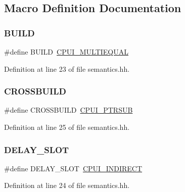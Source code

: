 \subsection{Macro Definition Documentation}
\mbox{\label{semantics_8hh_a03505fe2d99ef550d9e1d39f57048908}} 
\subsubsection{\texorpdfstring{BUILD}{BUILD}}
{\footnotesize\ttfamily \#define B\+U\+I\+LD~\mbox{\hyperlink{opcodes_8hh_abeb7dfb0e9e2b3114e240a405d046ea7a108d223da48e77fa181637fc3e75d9e8}{C\+P\+U\+I\+\_\+\+M\+U\+L\+T\+I\+E\+Q\+U\+AL}}}



Definition at line 23 of file semantics.\+hh.

\mbox{\label{semantics_8hh_a2b03cfa43a7f7132ca5adeb2ea9199ec}} 
\subsubsection{\texorpdfstring{CROSSBUILD}{CROSSBUILD}}
{\footnotesize\ttfamily \#define C\+R\+O\+S\+S\+B\+U\+I\+LD~\mbox{\hyperlink{opcodes_8hh_abeb7dfb0e9e2b3114e240a405d046ea7acd169003bfcb2e8dde0cb2dc1f534449}{C\+P\+U\+I\+\_\+\+P\+T\+R\+S\+UB}}}



Definition at line 25 of file semantics.\+hh.

\mbox{\label{semantics_8hh_abaef87dd5a374a8e2f3b01f0ae6ed3e4}} 
\subsubsection{\texorpdfstring{DELAY\_SLOT}{DELAY\_SLOT}}
{\footnotesize\ttfamily \#define D\+E\+L\+A\+Y\+\_\+\+S\+L\+OT~\mbox{\hyperlink{opcodes_8hh_abeb7dfb0e9e2b3114e240a405d046ea7aa89e33b07a26ca7d26b54315e45c8424}{C\+P\+U\+I\+\_\+\+I\+N\+D\+I\+R\+E\+CT}}}



Definition at line 24 of file semantics.\+hh.

